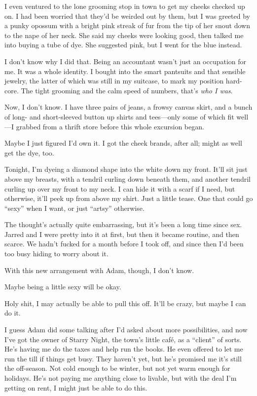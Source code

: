 I even ventured to the lone grooming stop in town to get my cheeks checked up on. I had been worried that they'd be weirded out by them, but I was greeted by a punky opossum with a bright pink streak of fur from the tip of her snout down to the nape of her neck. She said my cheeks were looking good, then talked me into buying a tube of dye. She suggested pink, but I went for the blue instead.

I don't know why I did that. Being an accountant wasn't just an occupation for me. It was a whole identity. I bought into the smart pantsuits and that sensible jewelry, the latter of which was still in my suitcase, to mark my position hard-core. The tight grooming and the calm speed of numbers, that's \emph{who I was}.

Now, I don't know. I have three pairs of jeans, a frowsy canvas skirt, and a bunch of long- and short-sleeved button up shirts and tees---only some of which fit well---I grabbed from a thrift store before this whole excursion began.

Maybe I just figured I'd own it. I got the cheek brands, after all; might as well get the dye, too.

Tonight, I'm dyeing a diamond shape into the white down my front. It'll sit just above my breasts, with a tendril curling down beneath them, and another tendril curling up over my front to my neck. I can hide it with a scarf if I need, but otherwise, it'll peek up from above my shirt. Just a little tease. One that could go ``sexy'' when I want, or just ``artsy'' otherwise.

The thought's actually quite embarrassing, but it's been a long time since sex. Jarred and I were pretty into it at first, but then it became routine, and then scarce. We hadn't fucked for a month before I took off, and since then I'd been too busy hiding to worry about it.

With this new arrangement with Adam, though, I don't know.

Maybe being a little sexy will be okay.

\secdiv{}

\noindent Holy shit, I may actually be able to pull this off. It'll be crazy, but maybe I can do it.

I guess Adam did some talking after I'd asked about more possibilities, and now I've got the owner of Starry Night, the town's little café, as a ``client'' of sorts. He's having me do the taxes and help run the books. He even offered to let me run the till if things get busy. They haven't yet, but he's promised me it's still the off-season. Not cold enough to be winter, but not yet warm enough for holidays. He's not paying me anything close to livable, but with the deal I'm getting on rent, I might just be able to do this.


